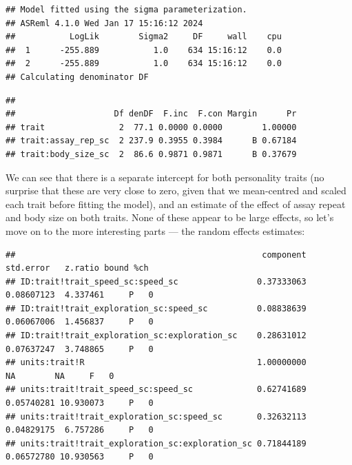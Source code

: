 \documentclass[
  12pt,
]{book}
\newenvironment{Shaded}{\begin{snugshade}}{\end{snugshade}}
\newcommand{\KeywordTok}[1]{\textcolor[rgb]{0.13,0.29,0.53}{\textbf{#1}}}
\newcommand{\NormalTok}[1]{#1}
\newcommand{\OperatorTok}[1]{\textcolor[rgb]{0.81,0.36,0.00}{\textbf{#1}}}
\begin{document}
\begin{verbatim}
## Model fitted using the sigma parameterization.
## ASReml 4.1.0 Wed Jan 17 15:16:12 2024
##           LogLik        Sigma2     DF     wall    cpu
##  1      -255.889           1.0    634 15:16:12    0.0
##  2      -255.889           1.0    634 15:16:12    0.0
## Calculating denominator DF
\end{verbatim}

\begin{verbatim}
## 
##                    Df denDF  F.inc  F.con Margin      Pr
## trait               2  77.1 0.0000 0.0000        1.00000
## trait:assay_rep_sc  2 237.9 0.3955 0.3984      B 0.67184
## trait:body_size_sc  2  86.6 0.9871 0.9871      B 0.37679
\end{verbatim}

We can see that there is a separate intercept for both personality traits (no surprise that these are very close to zero, given that we mean-centred and scaled each trait before fitting the model), and an estimate of the effect of assay repeat and body size on both traits. None of these appear to be large effects, so let's move on to the more interesting parts --- the random effects estimates:

\begin{Shaded}
\end{Shaded}

\begin{verbatim}
##                                                  component  std.error   z.ratio bound %ch
## ID:trait!trait_speed_sc:speed_sc                0.37333063 0.08607123  4.337461     P   0
## ID:trait!trait_exploration_sc:speed_sc          0.08838639 0.06067006  1.456837     P   0
## ID:trait!trait_exploration_sc:exploration_sc    0.28631012 0.07637247  3.748865     P   0
## units:trait!R                                   1.00000000         NA        NA     F   0
## units:trait!trait_speed_sc:speed_sc             0.62741689 0.05740281 10.930073     P   0
## units:trait!trait_exploration_sc:speed_sc       0.32632113 0.04829175  6.757286     P   0
## units:trait!trait_exploration_sc:exploration_sc 0.71844189 0.06572780 10.930563     P   0
\end{verbatim}
\end{document}

